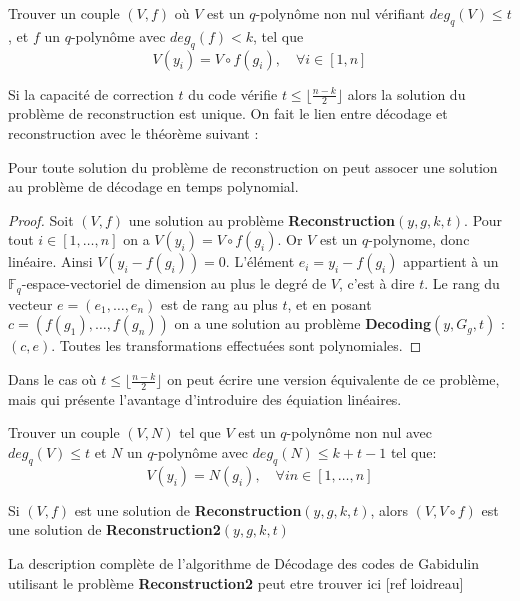 \documentclass[12pt]{article}
\begin{document}
\begin{defi}[Reconstruction$(y,g,k,t)$]
Trouver un couple $(V,f)$ où $V$ est un $q$-polynôme non nul vérifiant $deg_q(V) \leq t$, et $f$ un $q$-polynôme avec $deg_q(f) < k$, tel que
$$ V(y_i) = V \circ f(g_i), \quad \forall i \in [1,n]$$
\end{defi}

Si la capacité de correction $t$ du code vérifie $t \leq \lfloor \frac{n-k}{2} \rfloor$ alors la solution du problème de reconstruction est unique. On fait le lien entre décodage et reconstruction avec le théorème suivant :

\begin{thm}
Pour toute solution du problème de reconstruction on peut assocer une solution au problème de décodage en temps polynomial.
\end{thm}

\begin{proof}
Soit $(V,f)$ une solution au problème \textbf{Reconstruction}$(y,g,k,t)$. Pour tout $i \in [1, \ldots, n]$ on a $V(y_i) = V \circ f(g_i)$. Or $V$ est un $q$-polynome, donc linéaire. Ainsi   $V(y_i - f(g_i)) = 0$. L'élément $e_i = y_i - f(g_i)$ appartient à un $\mathbb{F}_q$-espace-vectoriel de dimension au plus le degré de $V$, c'est à dire $t$. Le rang du vecteur $e = (e_1, \ldots, e_n)$ est de rang au plus $t$, et en posant $c=(f(g_1), \ldots, f(g_n))$ on a une solution au problème \textbf{Decoding}$(y, G_g,t)$ : $(c,e)$.
\newline
Toutes les transformations effectuées sont polynomiales.
\end{proof}

Dans le cas où $t \leq \lfloor \frac{n-k}{2} \rfloor$ on peut écrire une version équivalente de ce problème, mais qui présente l'avantage d'introduire des équiation linéaires.

\begin{defi}[Reconstruction2$(y,g,k,t)$]
Trouver un couple $(V,N)$ tel que $V$ est un $q$-polynôme non nul avec $deg_q(V) \leq t$ et $N$ un $q$-polynôme avec $deg_q(N) \leq k+t-1$ tel que:
$$ V(y_i) = N(g_i), \quad \forall in \in [1,\ldots,n]$$
\end{defi}

\begin{thm}
Si $(V,f)$ est une solution de \textbf{Reconstruction}$(y,g,k,t)$, alors $(V, V \circ f)$ est une solution de \textbf{Reconstruction2}$(y,g,k,t)$
\end{thm}

La description complète de l'algorithme de Décodage des codes de Gabidulin utilisant le problème \textbf{Reconstruction2} peut etre trouver ici [ref loidreau]
\end{document}

